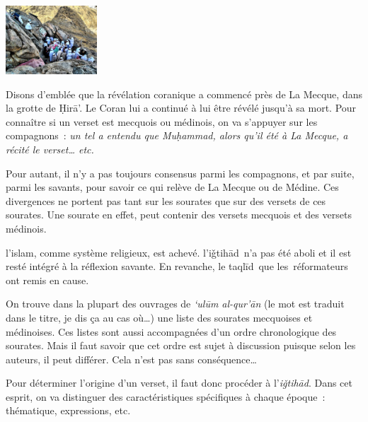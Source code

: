 
\begin{marginfigure}
\includegraphics[width=1.34722in,height=1.01046in]{Images/image051.jpg}

\end{marginfigure}


Disons d'emblée que la révélation coranique a commencé près de La
Mecque, dans la grotte de Ḥirā'. Le Coran lui a continué à lui être
révélé jusqu'à sa mort. Pour connaître si un verset est mecquois ou
médinois, on va s'appuyer sur les compagnons~: \emph{un tel a entendu
que Muḥammad, alors qu'il été à La Mecque, a récité le verset\ldots{}
etc.}

Pour autant, il n'y a pas toujours consensus parmi les compagnons, et
par suite, parmi les savants, pour savoir ce qui relève de La Mecque ou
de Médine. Ces divergences ne portent pas tant sur les sourates que sur
des versets de ces sourates. Une sourate en effet, peut contenir des
versets mecquois et des versets médinois.

\begin{Synthesis}
{l'islam, comme système religieux, est achevé.
l'iǧtihād~n'a pas été aboli et il est resté intégré à la réflexion
savante. En revanche, le taqlīd~que les~réformateurs ont remis en
cause.}
\end{Synthesis}

On trouve dans la plupart des ouvrages de \emph{`ulūm al-qur'ān} (le mot
est traduit dans le titre, je dis ça au cas où\ldots) une liste des
sourates mecquoises et médinoises. Ces
listes sont aussi accompagnées d'un ordre chronologique des sourates.
Mais il faut savoir que cet ordre est sujet à discussion puisque selon
les auteurs, il peut différer. Cela n'est pas sans conséquence\ldots{}

Pour déterminer l'origine d'un verset, il faut donc procéder à
l'\emph{iǧtihād}. Dans cet esprit, on va distinguer des caractéristiques
spécifiques à chaque époque~: thématique, expressions, etc.


